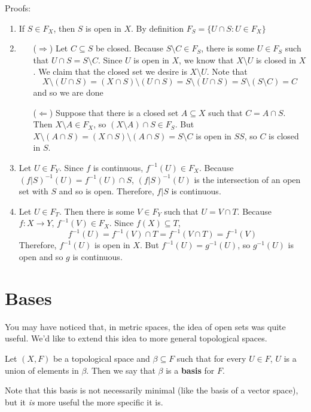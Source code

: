 Proofs:
\begin{enumerate}
\item If $S \in F_X$, then $S$ is open in $X$.  By definition $F_S = \{ U\cap S : U\in F_X\}$
\item 
\begin{itemize}
\item [($\Rightarrow$)] Let $C\subseteq S$ be closed.  Because $S\setminus C \in F_S$, there is some $U\in F_S$ such that $U\cap S = S\setminus C$.  Since $U$ is open in $X$, we know that $X\setminus U$ is closed in $X$.  We claim that the closed set we desire is $X\setminus U$.  Note that
\[ X\setminus (U\cap S) = (X\cap S)\setminus (U\cap S) = S\setminus (U\cap S) = S\setminus (S\setminus C) = C\]
and so we are done
\item [($\Leftarrow$)] Suppose that there is a closed set $A\subseteq X$ such that $C = A\cap S$.  Then $X\setminus A \in F_X$, so $(X\setminus A)\cap S \in F_S$.  But $X\setminus (A\cap S) = (X\cap S)\setminus (A\cap S) = S\setminus C$ is open in $SS$, so $C$ is closed in $S$.
\end{itemize}
\item Let $U\in F_Y$.  Since $f$ is continuous, $f^{-1}(U)\in F_X$.  Because $(f|S)^{-1}(U) = f^{-1}(U)\cap S$, $(f|S)^{-1}(U)$ is the intersection of an open set with $S$ and so is open.  Therefore, $f|S$ is continuous.
\item Let $U\in F_T$.  Then there is some $V\in F_Y$ such that $U = V\cap T$.  Because $f:X\to Y$, $f^{-1}(V)\in F_X$.  Since $f(X)\subseteq T$, 
\[ f^{-1}(U) = f^{-1}(V)\cap T = f^{-1}(V\cap T) = f^{-1}(V) \]
Therefore, $f^{-1}(U)$ is open in $X$.  But $f^{-1}(U) = g^{-1}(U)$, so $g^{-1}(U)$ is open and so $g$ is continuous.
\end{enumerate}

\section{Bases}
You may have noticed that, in metric spaces, the idea of open sets was quite useful.  We'd like to extend this idea to more general topological spaces.

\begin{definition}
Let $(X,F)$ be a topological space and $\beta\subseteq F$ such that for every $U\in F$, $U$ is a union of elements in $\beta$.  Then we say that $\beta$ is a {\bf basis} for $F$.
\end{definition}

Note that this basis is not necessarily minimal (like the basis of a vector space), but it {\it is} more useful the more specific it is.

